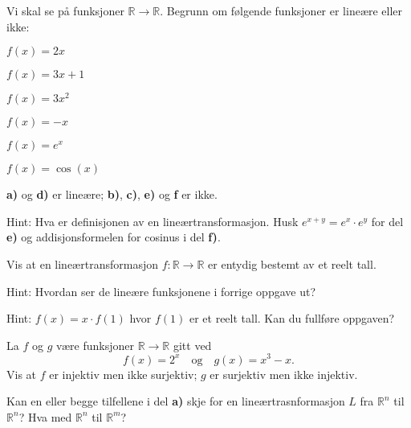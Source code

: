 \begin{oppgave}
\label{oppg:1dlintrans}
Vi skal se på funksjoner $\mathbb{R}\rightarrow \mathbb{R}$. Begrunn om følgende funksjoner er lineære eller ikke:

\begin{punkt}
$f(x) = 2x$
\end{punkt}

\begin{punkt}
$f(x) = 3x+1$
\end{punkt}

\begin{punkt}
$f(x) = 3x^2$
\end{punkt}

\begin{punkt}
$f(x)= -x$
\end{punkt}

\begin{punkt}
$f(x)=e^x$
\end{punkt}

\begin{punkt}
$f(x)=\cos (x)$
\end{punkt}
\end{oppgave}

\begin{losning}

\textbf{a)} og \textbf{d)} er lineære; \textbf{b)}, \textbf{c)}, \textbf{e)} og \textbf{f} er ikke.

\noindent
Hint: Hva er definisjonen av en lineærtransformasjon. Husk $e^{x+y}=e^x\cdot e^y$ for del \textbf{e)} og addisjonsformelen for cosinus i del \textbf{f)}.

\end{losning}


\begin{oppgave}
Vis at en lineærtransformasjon $f:\mathbb{R}\rightarrow \mathbb{R}$ er entydig bestemt av et reelt tall.

\noindent 
Hint: Hvordan ser de lineære funksjonene i forrige oppgave ut?
\end{oppgave}


\begin{losning}
Hint: $f(x)=x\cdot f(1)$ hvor $f(1)$ er et reelt tall. Kan du fullføre oppgaven?
\end{losning}


\begin{oppgave}
\begin{punkt}
La $f$ og $g$ være funksjoner $\mathbb{R}\rightarrow \mathbb{R}$ gitt ved $$f(x)=2^x \quad \text{og} \quad g(x)=x^3-x.$$ Vis at $f$ er injektiv men ikke surjektiv; $g$ er surjektiv men ikke injektiv.

\end{punkt}
\begin{punkt}
Kan en eller begge tilfellene i del \textbf{a)} skje for en lineærtrasnformasjon $L$ fra $\mathbb{R}^n$ til $\mathbb{R}^n$? Hva med $\mathbb{R}^n$ til $\mathbb{R}^m$?
\end{punkt}

\end{oppgave}

